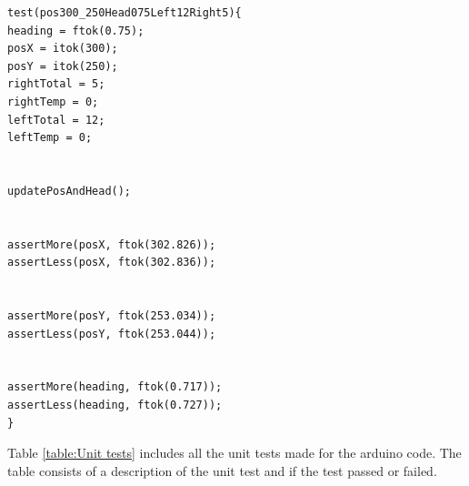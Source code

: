 \begin{lstlisting}[caption={Second type of Unit test}, label={ut2}]
test(pos300_250Head075Left12Right5){
heading = ftok(0.75);
posX = itok(300);
posY = itok(250);
rightTotal = 5;
rightTemp = 0;
leftTotal = 12;
leftTemp = 0;


updatePosAndHead();


assertMore(posX, ftok(302.826));
assertLess(posX, ftok(302.836)); 


assertMore(posY, ftok(253.034));
assertLess(posY, ftok(253.044));


assertMore(heading, ftok(0.717));
assertLess(heading, ftok(0.727));  
}
\end{lstlisting}


Table \ref{table:Unit tests} includes all the unit tests made for the arduino code. The table consists of a description of the unit test and if the test passed or failed. 
